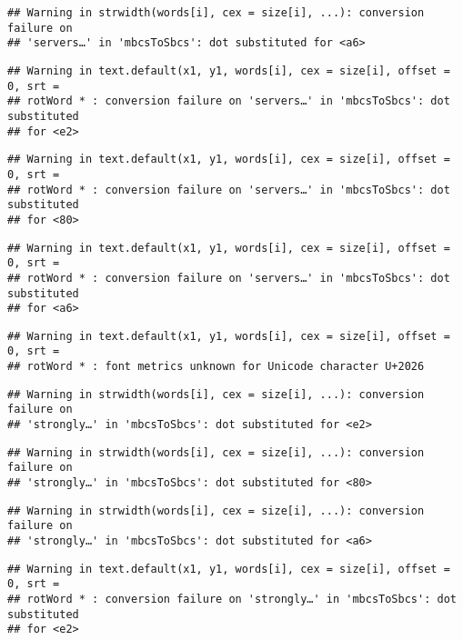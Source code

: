 \documentclass[]{article}
\begin{document}
\begin{verbatim}
## Warning in strwidth(words[i], cex = size[i], ...): conversion failure on
## 'servers…' in 'mbcsToSbcs': dot substituted for <a6>
\end{verbatim}

\begin{verbatim}
## Warning in text.default(x1, y1, words[i], cex = size[i], offset = 0, srt =
## rotWord * : conversion failure on 'servers…' in 'mbcsToSbcs': dot substituted
## for <e2>
\end{verbatim}

\begin{verbatim}
## Warning in text.default(x1, y1, words[i], cex = size[i], offset = 0, srt =
## rotWord * : conversion failure on 'servers…' in 'mbcsToSbcs': dot substituted
## for <80>
\end{verbatim}

\begin{verbatim}
## Warning in text.default(x1, y1, words[i], cex = size[i], offset = 0, srt =
## rotWord * : conversion failure on 'servers…' in 'mbcsToSbcs': dot substituted
## for <a6>
\end{verbatim}

\begin{verbatim}
## Warning in text.default(x1, y1, words[i], cex = size[i], offset = 0, srt =
## rotWord * : font metrics unknown for Unicode character U+2026
\end{verbatim}

\begin{verbatim}
## Warning in strwidth(words[i], cex = size[i], ...): conversion failure on
## 'strongly…' in 'mbcsToSbcs': dot substituted for <e2>
\end{verbatim}

\begin{verbatim}
## Warning in strwidth(words[i], cex = size[i], ...): conversion failure on
## 'strongly…' in 'mbcsToSbcs': dot substituted for <80>
\end{verbatim}

\begin{verbatim}
## Warning in strwidth(words[i], cex = size[i], ...): conversion failure on
## 'strongly…' in 'mbcsToSbcs': dot substituted for <a6>
\end{verbatim}

\begin{verbatim}
## Warning in text.default(x1, y1, words[i], cex = size[i], offset = 0, srt =
## rotWord * : conversion failure on 'strongly…' in 'mbcsToSbcs': dot substituted
## for <e2>
\end{verbatim}
\end{document}
